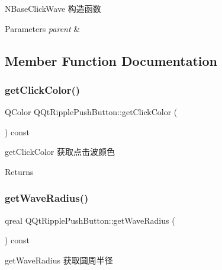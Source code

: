 N\+Base\+Click\+Wave 构造函数 


\begin{DoxyParams}{Parameters}
{\em parent} & \\
\hline
\end{DoxyParams}


\subsection{Member Function Documentation}
\mbox{\label{class_q_qt_ripple_push_button_a47fd23c309cbf59cd3819776ae6c1bd0}} 
\subsubsection{\texorpdfstring{get\+Click\+Color()}{getClickColor()}}
{\footnotesize\ttfamily Q\+Color Q\+Qt\+Ripple\+Push\+Button\+::get\+Click\+Color (\begin{DoxyParamCaption}{ }\end{DoxyParamCaption}) const}



get\+Click\+Color 获取点击波颜色 

\begin{DoxyReturn}{Returns}

\end{DoxyReturn}
\mbox{\label{class_q_qt_ripple_push_button_a621dfbd46b4f56e92c12b36e5efa76fe}} 
\subsubsection{\texorpdfstring{get\+Wave\+Radius()}{getWaveRadius()}}
{\footnotesize\ttfamily qreal Q\+Qt\+Ripple\+Push\+Button\+::get\+Wave\+Radius (\begin{DoxyParamCaption}{ }\end{DoxyParamCaption}) const}



get\+Wave\+Radius 获取圆周半径 

